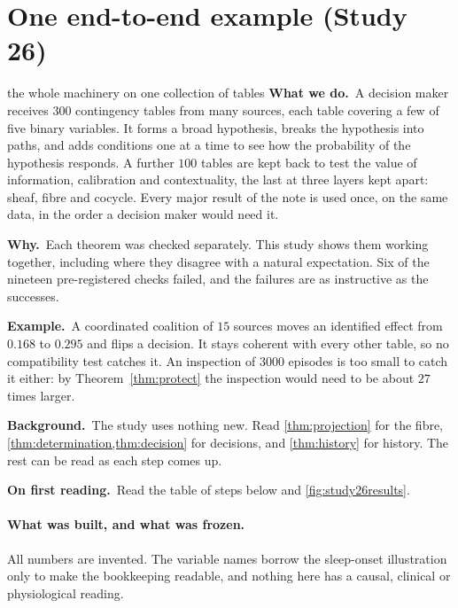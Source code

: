 \documentclass[11pt]{article}
\theoremstyle{definition}\newtheorem{definition}[theorem]{Definition}\newtheorem{remark}[theorem]{Remark}\newtheorem{example}[theorem]{Example}\newtheorem{problem}[theorem]{Open problem}\crefname{problem}{Problem}{Problems}
\newcommand{\rbwhat}{\textcolor{rbWhat}{\textbf{What we do.}}~}\newcommand{\rbwhy}{\par\smallskip\textcolor{rbWhy}{\textbf{Why.}}~}
\newcommand{\rbex}{\par\smallskip\textcolor{rbEx}{\textbf{Example.}}~}\newcommand{\rbbg}{\par\smallskip\textcolor{rbBg}{\textbf{Background.}}~}
\newcommand{\rbfirst}{\par\smallskip\textcolor{rbFirst}{\textbf{On first reading.}}~}
\begin{document}
\clearpage
\section{One end-to-end example (Study 26)}\label{sec:study26}
\begin{readerbox}{the whole machinery on one collection of tables}
\rbwhat A decision maker receives $300$ contingency tables from many sources, each table covering a few of five binary variables. It forms a broad hypothesis, breaks the hypothesis into paths, and adds conditions one at a time to see how the probability of the hypothesis responds. A further $100$ tables are kept back to test the value of information, calibration and contextuality, the last at three layers kept apart: sheaf, fibre and cocycle. Every major result of the note is used once, on the same data, in the order a decision maker would need it.
\rbwhy Each theorem was checked separately. This study shows them working together, including where they disagree with a natural expectation. Six of the nineteen pre-registered checks failed, and the failures are as instructive as the successes.
\rbex A coordinated coalition of $15$ sources moves an identified effect from $0.168$ to $0.295$ and flips a decision. It stays coherent with every other table, so no compatibility test catches it. An inspection of $3000$ episodes is too small to catch it either: by Theorem~\ref{thm:protect} the inspection would need to be about $27$ times larger.
\rbbg The study uses nothing new. Read \cref{thm:projection} for the fibre, \cref{thm:determination,thm:decision} for decisions, and \cref{thm:history} for history. The rest can be read as each step comes up.
\rbfirst Read the table of steps below and \cref{fig:study26results}.
\end{readerbox}

\paragraph{What was built, and what was frozen.} All numbers are invented. The variable names borrow the sleep-onset illustration only to make the bookkeeping readable, and nothing here has a causal, clinical or physiological reading.
\end{document}
